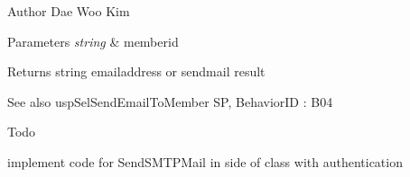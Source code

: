 \begin{DoxyAuthor}{Author}
Dae Woo Kim 
\end{DoxyAuthor}

\begin{DoxyParams}{Parameters}
{\em string} & memberid \\
\hline
\end{DoxyParams}
\begin{DoxyReturn}{Returns}
string emailaddress or sendmail result 
\end{DoxyReturn}
\begin{DoxySeeAlso}{See also}
usp\+Sel\+Send\+Email\+To\+Member SP, Behavior\+ID \+: B04 
\end{DoxySeeAlso}
\begin{DoxyRefDesc}{Todo}
\item[\hyperlink{a00001__todo000013}{Todo}]implement code for Send\+S\+M\+T\+P\+Mail in side of class with authentication \end{DoxyRefDesc}
